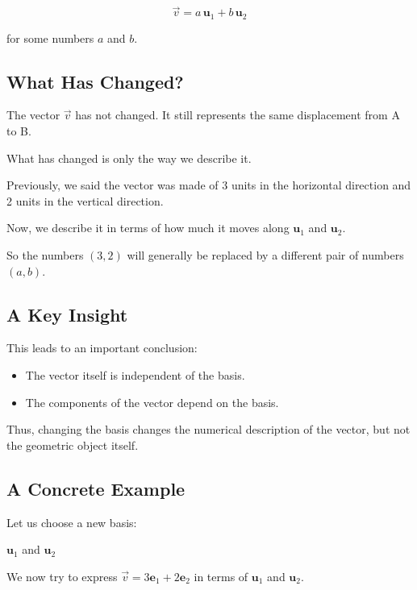 \documentclass[11pt,openany]{book}
\theoremstyle{definition}
\begin{document}
\[
\vec{v} = a\,\mathbf{u}_1 + b\,\mathbf{u}_2
\]

for some numbers $a$ and $b$.

\medskip

\subsection{What Has Changed?}

The vector $\vec{v}$ has not changed.
It still represents the same displacement from A to B.

What has changed is only the way we describe it.

Previously, we said the vector was made of 3 units in the horizontal direction and 2 units in the vertical direction.

Now, we describe it in terms of how much it moves along $\mathbf{u}_1$ and $\mathbf{u}_2$.

So the numbers $(3,2)$ will generally be replaced by a different pair of numbers $(a,b)$.

\medskip

\subsection{A Key Insight}

This leads to an important conclusion:

\begin{itemize}
  \item The vector itself is independent of the basis.
  \item The components of the vector depend on the basis.
\end{itemize}

Thus, changing the basis changes the numerical description of the vector,
but not the geometric object itself.


\subsection{A Concrete Example}

Let us choose a new basis:

$\mathbf{u}_1$ and $\mathbf{u}_2$


We now try to express $\vec{v} = 3\mathbf{e}_1 + 2\mathbf{e}_2$ in terms of $\mathbf{u}_1$ and $\mathbf{u}_2$.
\end{document}
